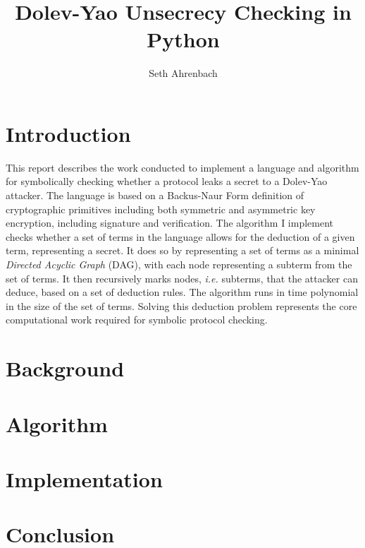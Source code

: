 \documentclass{article}
\begin{document}
\title{Dolev-Yao Unsecrecy Checking in Python}
\author{Seth Ahrenbach}
\date{}
\maketitle
\doublespace

\section{Introduction}
This report describes the work conducted to implement a language and algorithm for symbolically checking whether a protocol leaks a secret to a Dolev-Yao attacker. The language is based on a Backus-Naur Form definition of cryptographic primitives including both symmetric and asymmetric key encryption, including signature and verification. The algorithm I implement checks whether a set of terms in the language allows for the deduction of a given term, representing a secret. It does so by representing a set of terms as a minimal \emph{Directed Acyclic Graph} (DAG), with each node representing a subterm from the set of terms. It then recursively marks nodes, \emph{i.e.} subterms, that the attacker can deduce, based on a set of deduction rules. The algorithm runs in time polynomial in the size of the set of terms. Solving this deduction problem represents the core computational work required for symbolic protocol checking.

\section{Background}

\section{Algorithm}

\section{Implementation}

\section{Conclusion}
\end{document}
